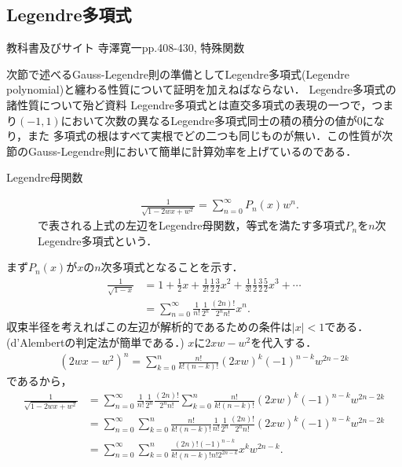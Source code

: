\documentclass[a4j,papersize,disablejfam,slide,14pt]{jsarticle}
\begin{document}
\subsection{{\rm Legendre}多項式}
	\begin{itembox}[l]{教科書及びサイト}
    	{\rm 寺澤寛一\cite{terakan}pp.408-430, 特殊関数\cite{legendre_polynomial}}
    \end{itembox}
	次節で述べる{\rm Gauss-Legendre}則の準備として{\rm Legendre}多項式({\rm Legendre polynomial})と纏わる性質について証明を加えねばならない．
    {\rm Legendre}多項式の諸性質について殆ど資料%
    {\rm Legendre}多項式とは直交多項式の表現の一つで，つまり$(-1, 1)$において次数の異なる{\rm Legendre}多項式同士の積の積分の値が$0$になり，また
    多項式の根はすべて実根でどの二つも同じものが無い．この性質が次節の{\rm Gauss-Legendre}則において簡単に計算効率を上げているのである．
    \begin{screen}
    	\begin{description}
        \item[{\rm Legendre}母関数]
        	\begin{align}
            	\frac{1}{\sqrt{1 - 2wx + w^2}} = \sum_{n=0}^{\infty} P_n(x) w^n. \label{eq:legendre_generating}
            \end{align}
            で表される上式の左辺を{\rm Legendre}母関数，等式を満たす多項式$P_n$を$n$次{\rm Legendre}多項式という．
    	\end{description}
    \end{screen}
    まず$P_n(x)$が$x$の$n$次多項式となることを示す．
    \begin{align}
    	\frac{1}{\sqrt{1-x}} &= 1 + \frac{1}{2}x + \frac{1}{2!}\frac{1}{2}\frac{3}{2}x^2 + \frac{1}{3!}\frac{1}{2}\frac{3}{2}\frac{5}{2}x^3 + \cdots \\
        &= \sum_{n=0}^{\infty} \frac{1}{n!}\frac{1}{2^n}\frac{(2n)!}{2^n n!} x^n.
    \end{align}
    収束半径を考えればこの左辺が解析的であるための条件は$|x|<1$である．({\rm d'Alembert}の判定法が簡単である．)
    $x$に$2xw - w^2$を代入する．
    \begin{align}
    	(2wx - w^2)^n = \sum_{k=0}^{n} \frac{n!}{k!(n-k)!} (2xw)^k (-1)^{n-k} w^{2n-2k}
    \end{align}
    であるから，
    \begin{align}
    	\frac{1}{\sqrt{1 - 2wx + w^2}} &= \sum_{n=0}^{\infty} \frac{1}{n!}\frac{1}{2^n}\frac{(2n)!}{2^n n!} \sum_{k=0}^{n} \frac{n!}{k!(n-k)!} (2xw)^k (-1)^{n-k} w^{2n-2k} \\
        &= \sum_{n=0}^{\infty} \sum_{k=0}^{n} \frac{n!}{k!(n-k)!} \frac{1}{n!}\frac{1}{2^n}\frac{(2n)!}{2^n n!} (2xw)^k (-1)^{n-k} w^{2n-2k} \\
        &= \sum_{n=0}^{\infty} \sum_{k=0}^{n} \frac{(2n)! (-1)^{n-k}}{k!(n-k)!n!2^{2n-k}} x^k w^{2n-k}.
    \end{align}
\end{document}
